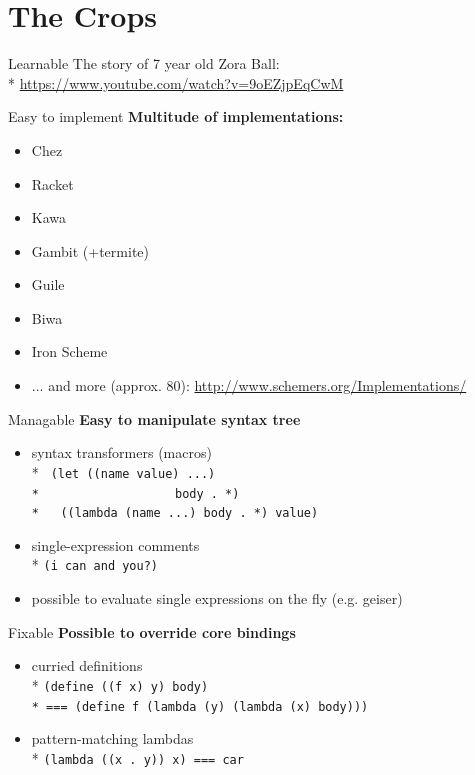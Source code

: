 \documentclass{beamer}
\begin{document}
\section{The Crops}

\begin{frame}{Learnable}
  The story of 7 year old Zora Ball: \\*
  \url{https://www.youtube.com/watch?v=9oEZjpEqCwM}
\end{frame}

\begin{frame}{Easy to implement}
  \textbf{Multitude of implementations:}
  \begin{itemize}
    \pause
  \item Chez
    \pause
  \item Racket
    \pause
  \item Kawa
    \pause
  \item Gambit (+termite)
    \pause
  \item Guile
    \pause
  \item Biwa
    \pause
  \item Iron Scheme
    \pause
  \item ... and more (approx. 80): \url{http://www.schemers.org/Implementations/}
  \end{itemize}
\end{frame}

\begin{frame}[fragile]{Managable}
  \textbf{Easy to manipulate syntax tree}
  \begin{itemize}
  \item <1-> syntax transformers (macros)\\*
    \texttt{ (let ((name value) ...)\\*
      \ \ \ \ \ \ \ \ \ \ \ \ \ \ \ \ \ \ body . *)\\*
      \ \ ((lambda (name ...) body . *) value) }
  \item <3-> single-expression comments\\*
    \texttt{(i can  and you?)}
  \item <5-> possible to evaluate single expressions on the fly (e.g. geiser)
  \end{itemize}
\end{frame}

\begin{frame}{Fixable}
  \textbf{Possible to override core bindings}
  \begin{itemize}
    \pause
  \item curried definitions\\*
    {\small \texttt{(define ((f x) y) body)\\*
        === (define f (lambda (y) (lambda (x) body)))}}
    \pause
    \item pattern-matching lambdas\\*
    \texttt{(lambda ((x . y)) x) === car}
  \end{itemize}
\end{frame}
\end{document}
